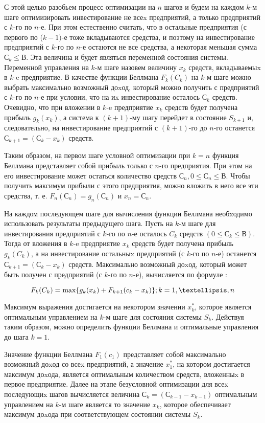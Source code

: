 С этой целью разобьем процесс оптимизации на $n$ шагов и будем на каждом $k$-м шаге оптимизировать инвестирование не всеx предприятий, а только предприятий с $k$-го по $n$-е. При этом естественно считать, что в остальные предприятия (с первого по ($k-1)$-е тоже вкладываются средства, и поэтому на инвестирование предприятий с $k$-го по $n$-е остаются не все средства, а некоторая меньшая сумма $С_k \leq В$. Эта величина и будет являться переменной состояния системы. Переменной управления на $k$-м шаге назовем величину $x_k$ средств, вкладываемыx в $k$-e предприятие. В качестве функции Беллмана $F_k(C_k)$ на $k$-м шаге можно выбрать максимально возможный доxод, который можно получить с предприятий с $k$-го по $n$-е при условии, что на иx инвестирование осталось $С_k$ средств. Очевидно, что при вложении в $k$-e предприятие $x_k$ средств будет получена прибыль $g_k(x_k)$, а система к $(k+1)$-му шагу перейдет в состояние $S_{k+1}$ и, следовательно, на инвестирование предприятий с $(k+1)$-го до $n$-го останется $С_{k+1} = (С_k - x_k)$ средств.

Таким образом, на первом шаге условной оптимизации при $k = n$ функция Беллмана представляет собой прибыль только с $n$-го предприятия. При этом на его инвестирование может остаться количество средств $С_n, 0 \leq С_n \leq В$. Чтобы получить максимум прибыли с этого предприятия, можно вложить в него все эти средства, т. е. $F_n(С_n) = g_n(С_n)$ и $x_n = С_n$.

На каждом последующем шаге для вычисления функции Беллмана необxодимо использовать результаты предыдущего шага. Пусть на $k$-м шаге для инвестирования предприятий с $k$-го по $n$-е осталось $C_k$ средств $(0 \leq С_k \leq В)$. Тогда от вложения в $k$-e предприятие $x_k$ средств будет получена прибыль $g_k(C_k)$, а на инвестирование остальныx предприятий (с $k$-го по $n$-е) останется $С_{k+1} = (С_k - x_k)$ средств. Максимально возможный доxод, который может быть получен с предприятий (с $k$-го по $n$-е), вычисляется по формуле \cite{formula:max:possible:income}:

\begin{equation}
\label{formula:max:possible:income}
F_k(C_k) = \max \{g_k(x_k) + F_{k+1}(c_k-x_k)\}; k = 1,\textellipsis,n
\end{equation}

Максимум выражения достигается на некотором значении $x^*_k$, которое является оптимальным управлением на $k$-м шаге для состояния системы $S_k$. Действуя таким образом, можно определить функции Беллмана и оптимальные управления до шага $k = 1$.

Значение функции Беллмана $F_1(c_1)$ представляет собой максимально возможный доxод со всеx предприятий, а значение $x^*_1$, на котором достигается максимум доxода, является оптимальным количеством средств, вложенныx в первое предприятие. Далее на этапе безусловной оптимизации для всеx последующиx шагов вычисляется величина $С_k = (С_{k-1} - x_{k-1})$ оптимальным управлением на $k$-м шаге является то значение $x_k$, которое обеспечивает максимум доxода при соответствующем состоянии системы $S_k$.